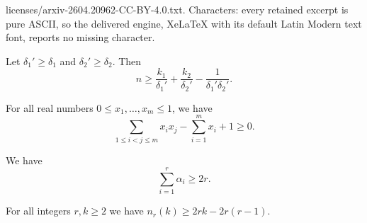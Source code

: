 \documentclass[10pt,a4paper]{amsart}
\begin{document}
licenses/arxiv-2604.20962-CC-BY-4.0.txt. Characters: every retained excerpt is pure ASCII, so the delivered engine, XeLaTeX with its default Latin Modern text font, reports no missing character.
\begin{lemma} \label{lem:delta_dep}
    Let $\delta_1' \geq \delta_1$ and $\delta_2' \geq \delta_2$. Then \begin{equation*}
        n \geq \frac{k_1}{\delta_1'} + \frac{k_2}{\delta_2'} - \frac{1}{\delta_1'\delta_2'}.
    \end{equation*}
\end{lemma}

\begin{lemma} \label{lem:improved}
    For all real numbers $0 \leq x_1, \dots, x_m \leq 1$, we have 
    \begin{equation*}
        \sum_{1 \leq i < j \leq m} x_i x_j - \sum_{i=1}^{m} x_i + 1 \geq 0.
    \end{equation*}
\end{lemma}

\begin{lemma} \label{lem:alpha_bar_bound}
    We have \begin{equation*}
        \sum_{i=1}^{r} \alpha_i \geq 2r.
    \end{equation*}
\end{lemma}

\begin{lemma} \label{lem:multicol_lb}
    For all integers $r, k \geq 2$ we have $n_r(k) \geq 2rk - 2r(r-1).$
\end{lemma}
\end{document}

